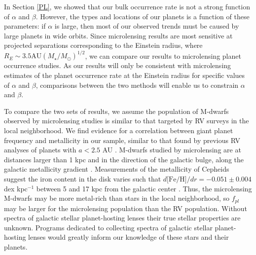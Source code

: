 In Section \ref{PL}, we showed that our bulk occurrence rate is not a strong function of $\alpha$ and $\beta$. However, the types and locations of our planets is a function of these parameters: if $\alpha$ is large, then most of our observed trends must be caused by large planets in wide orbits. Since microlensing results are most sensitive at projected separations corresponding to the Einstein radius, where $R_E \sim 3.5 \textrm{AU} (M_\star/M_\odot)^{1/2}$, we can compare our results to microlensing planet occurrence studies. As our results will only be consistent with microlensing estimates of the planet occurrence rate at the Einstein radius for specific values of $\alpha$ and $\beta$, comparisons between the two methods will enable us to constrain $\alpha$ and $\beta$. 

To compare the two sets of results, we assume the population of M-dwarfs observed by microlensing studies is similar to that targeted by RV surveys in the local neighborhood.  We find evidence for a correlation between giant planet frequency and metallicity in our sample, similar to that found by previous RV analyses of planets with $a < 2.5$ AU \citep{Fischer05, JohnsonApps09}. M-dwarfs studied by microlensing are at distances larger than 1 kpc and in the direction of the galactic bulge, along the galactic metallicity gradient \citep{Rolleston00}. Measurements of the metallicity of Cepheids suggest the iron content in the disk varies such that $d\textrm{[Fe/H]}/dr = -0.051 \pm 0.004$ dex kpc$^{-1}$ between 5 and 17 kpc from the galactic center \citep{Pedicelli09}. Thus, the microlensing M-dwarfs may be more metal-rich than stars in the local neighborhood, so $f_{pl}$ may be larger for the microlensing population than the RV population. Without spectra of galactic stellar planet-hosting lenses their true stellar properties are unknown. Programs dedicated to collecting spectra of galactic stellar planet-hosting lenses would greatly inform our knowledge of these stars and their planets.

